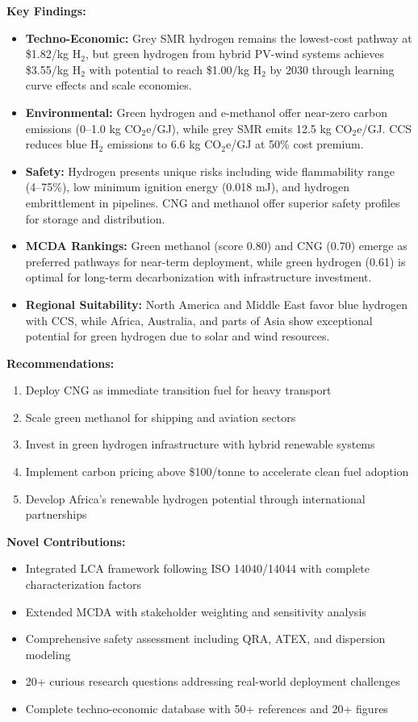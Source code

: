 \documentclass[12pt,twoside,openany]{book}
\begin{document}
\textbf{Key Findings:}

\begin{itemize}
    \item \textbf{Techno-Economic:} Grey SMR hydrogen remains the lowest-cost pathway at \$1.82/kg H$_2$, but green hydrogen from hybrid PV-wind systems achieves \$3.55/kg H$_2$ with potential to reach \$1.00/kg H$_2$ by 2030 through learning curve effects and scale economies.
    \item \textbf{Environmental:} Green hydrogen and e-methanol offer near-zero carbon emissions (0--1.0 kg CO$_2$e/GJ), while grey SMR emits 12.5 kg CO$_2$e/GJ. CCS reduces blue H$_2$ emissions to 6.6 kg CO$_2$e/GJ at 50\% cost premium.
    \item \textbf{Safety:} Hydrogen presents unique risks including wide flammability range (4--75\%), low minimum ignition energy (0.018 mJ), and hydrogen embrittlement in pipelines. CNG and methanol offer superior safety profiles for storage and distribution.
    \item \textbf{MCDA Rankings:} Green methanol (score 0.80) and CNG (0.70) emerge as preferred pathways for near-term deployment, while green hydrogen (0.61) is optimal for long-term decarbonization with infrastructure investment.
    \item \textbf{Regional Suitability:} North America and Middle East favor blue hydrogen with CCS, while Africa, Australia, and parts of Asia show exceptional potential for green hydrogen due to solar and wind resources.
\end{itemize}

\textbf{Recommendations:}
\begin{enumerate}
    \item Deploy CNG as immediate transition fuel for heavy transport
    \item Scale green methanol for shipping and aviation sectors
    \item Invest in green hydrogen infrastructure with hybrid renewable systems
    \item Implement carbon pricing above \$100/tonne to accelerate clean fuel adoption
    \item Develop Africa's renewable hydrogen potential through international partnerships
\end{enumerate}

\textbf{Novel Contributions:}
\begin{itemize}
    \item Integrated LCA framework following ISO 14040/14044 with complete characterization factors
    \item Extended MCDA with stakeholder weighting and sensitivity analysis
    \item Comprehensive safety assessment including QRA, ATEX, and dispersion modeling
    \item 20+ curious research questions addressing real-world deployment challenges
    \item Complete techno-economic database with 50+ references and 20+ figures
\end{itemize}
\end{document}
